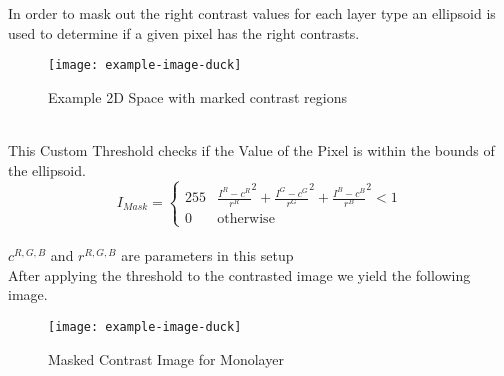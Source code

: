 In order to mask out the right contrast values for each layer type an ellipsoid is used to determine if a given pixel has the right contrasts.\\
\begin{figure}[h!]
    \centering
    \texttt{[image: example-image-duck]}
    \caption{Example 2D Space with marked contrast regions}
    \label{fig:my_label}
\end{figure}
\\
This Custom Threshold checks if the Value of the Pixel is within the bounds of the ellipsoid.\\
\begin{equation}
     I_{Mask} =
     \begin{cases}
      255 & \frac{I^R - c^R}{r^R}^2 + \frac{I^G - c^G}{r^G}^2 + \frac{I^B - c^B}{r^B}^2 < 1\\
      0 & \text{otherwise}
    \end{cases}
\end{equation}\\
$c^{R,G,B}$ and $r^{R,G,B}$ are parameters in this setup\\
After applying the threshold to the contrasted image we yield the following image.\\
\begin{figure}[h!]
    \centering
    \texttt{[image: example-image-duck]}
    \caption{Masked Contrast Image for Monolayer}
    \label{fig:my_label}
\end{figure}
